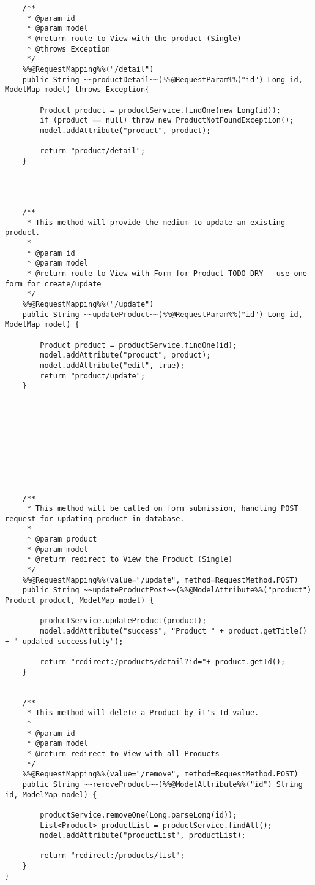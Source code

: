 \documentclass[12pt]{article}
\begin{document}
\begin{lstlisting}
    /**
     * @param id
     * @param model
     * @return route to View with the product (Single)
     * @throws Exception
     */
    %%@RequestMapping%%("/detail")
    public String ~~productDetail~~(%%@RequestParam%%("id") Long id, ModelMap model) throws Exception{

        Product product = productService.findOne(new Long(id));
        if (product == null) throw new ProductNotFoundException();
        model.addAttribute("product", product);

        return "product/detail";
    }




    /**
     * This method will provide the medium to update an existing product.
     *
     * @param id
     * @param model
     * @return route to View with Form for Product TODO DRY - use one form for create/update
     */
    %%@RequestMapping%%("/update")
    public String ~~updateProduct~~(%%@RequestParam%%("id") Long id, ModelMap model) {

        Product product = productService.findOne(id);
        model.addAttribute("product", product);
        model.addAttribute("edit", true);
        return "product/update";
    }










    /**
     * This method will be called on form submission, handling POST request for updating product in database.
     *
     * @param product
     * @param model
     * @return redirect to View the Product (Single)
     */
    %%@RequestMapping%%(value="/update", method=RequestMethod.POST)
    public String ~~updateProductPost~~(%%@ModelAttribute%%("product") Product product, ModelMap model) {

        productService.updateProduct(product);
        model.addAttribute("success", "Product " + product.getTitle()	+ " updated successfully");

        return "redirect:/products/detail?id="+ product.getId();
    }


    /**
     * This method will delete a Product by it's Id value.
     *
     * @param id
     * @param model
     * @return redirect to View with all Products
     */
    %%@RequestMapping%%(value="/remove", method=RequestMethod.POST)
    public String ~~removeProduct~~(%%@ModelAttribute%%("id") String id, ModelMap model) {

        productService.removeOne(Long.parseLong(id));
        List<Product> productList = productService.findAll();
        model.addAttribute("productList", productList);

        return "redirect:/products/list";
    }
}
\end{lstlisting}
\newpage
\end{document}
